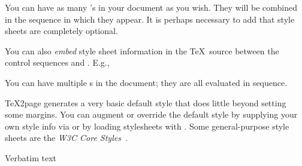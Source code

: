 You can have as many ’s in your
document as you wish.  They will be combined in
the sequence in which they appear.  It is perhaps
necessary to add that style sheets are completely
optional.


You can also {\em embed} style sheet information
in the \TeX\ source between the control sequences
\p{\cssblock} and \p{\endcssblock}.  E.g.,


\n You can
have multiple \p{\cssblock}s in the document; they
are all evaluated in sequence.

\TeX2page generates a very basic default style
that
does little beyond setting some margins.  You
can augment or override the default style by supplying your
own style info via \p{\cssblock} or by loading
stylesheets with .   Some general-purpose
style sheets are the {\em W3C Core
Styles}~\cite{w3ccorestyles}.

 Verbatim text

